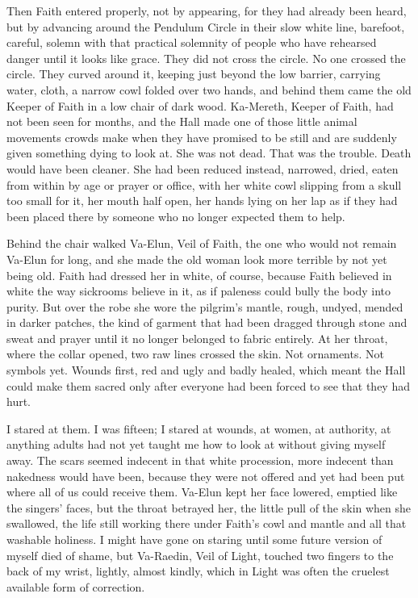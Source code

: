 Then Faith entered properly, not by appearing, for they had already been heard, but by advancing around the Pendulum Circle in their slow white line, 
barefoot, careful, solemn with that practical solemnity of people who have rehearsed danger until it looks like grace. They did not cross the circle. 
No one crossed the circle. 
They curved around it, keeping just beyond the low barrier, carrying water, cloth, a narrow cowl folded over two hands, and behind them came the old 
Keeper of Faith in a low chair of dark wood. 
Ka-Mereth, Keeper of Faith, had not been seen for months, and the Hall made one of those little animal movements crowds make when they have promised 
to be still and are suddenly given something dying to look at. She was not dead. That was the trouble. Death would have been cleaner. 
She had been reduced instead,  narrowed, dried, eaten from within by age or prayer or office, with her white cowl slipping from a skull too small for it, 
her mouth half open, her hands lying on her lap as if they had been placed there by someone who no longer expected them to help. \par


Behind the chair walked Va-Elun, Veil of Faith, the one who would not remain Va-Elun for long, and she made the old woman look more terrible by not yet being old. 
Faith had dressed her in white, of course, because Faith believed in white the way sickrooms believe in it, as if paleness could bully the body into purity. 
But over the robe she wore the pilgrim’s mantle, rough, undyed, mended in darker patches, the kind of garment that had been dragged through stone and sweat 
and prayer until it no longer belonged to fabric entirely. 
At her throat, where the collar opened, two raw lines crossed the skin. 
Not ornaments. 
Not symbols yet. 
Wounds first, red and ugly and badly healed, which meant the Hall could make them sacred only after everyone had been forced to see that they had hurt.\par

I stared at them. 
I was fifteen; I stared at wounds, at women, at authority, at anything adults had not yet taught me how to look at without giving myself away. 
The scars seemed indecent in that white procession, more indecent than nakedness would have been, because they were not offered and yet had 
been put where all of us could receive them. 
Va-Elun kept her face lowered, emptied like the singers’ faces, but the throat betrayed her, the little pull of the skin when she swallowed, 
the life still working there under Faith’s cowl and mantle and all that washable holiness. 
I might have gone on staring until some future version of myself died of shame, but Va-Raedin, Veil of Light, touched two fingers to the back of my wrist, 
lightly, almost kindly, which in Light was often the cruelest available form of correction.\par


